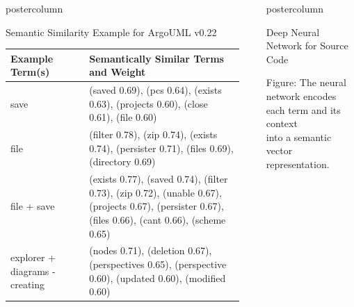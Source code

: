 \documentclass[final]{beamer} %
\begin{document}
\begin{frame}
\begin{columns}[t]
\begin{column}{.49\textwidth}
\begin{beamercolorbox}[center,wd=\textwidth]{postercolumn}
\begin{minipage}[T]{.95\textwidth}
\begin{block}{Semantic Similarity Example for ArgoUML v0.22}
              \begin{table}[t]
                \centering
                \begin{tabular}{p{0.32\linewidth}p{0.63\linewidth}}
                  \hline
                      {\bf Example Term(s)} & {\bf Semantically Similar Terms and Weight}\\ 
                      \hline
                      save & (saved 0.69), (pcs 0.64), (exists 0.63), (projects 0.60), (close 0.61), (file 0.60) \\ \hline
                      file & (filter 0.78), (zip 0.74), (exists 0.74), (persister 0.71), (files 0.69), (directory 0.69) \\ \hline
                      file + save & (exists 0.77), (saved 0.74), (filter 0.73), (zip 0.72), (unable 0.67), (projects 0.67), (persister 0.67), (files 0.66), (cant 0.66), (scheme 0.65) \\ \hline
                      explorer + diagrams \newline - creating & (nodes 0.71), (deletion 0.67), (perspectives 0.65), (perspective 0.60), (updated 0.60), (modified 0.60)\\
                      \hline
                \end{tabular}
              \end{table}
            \end{block}
              
        \end{minipage}
      \end{beamercolorbox}
    \end{column}

    \begin{column}{.49\textwidth}
      \begin{beamercolorbox}[center,wd=\textwidth]{postercolumn}
        \begin{minipage}[T]{.95\textwidth} %

          \begin{block}{Deep Neural Network for Source Code}

            \centering
            Figure: The neural network encodes each term and its context\\ 
            into a semantic vector representation.\par


\end{block}
\end{minipage}
\end{beamercolorbox}
\end{column}
\end{columns}
\end{frame}
\end{document}
